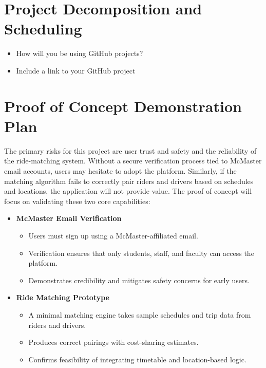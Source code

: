 \documentclass{article}
\begin{document}
\section{Project Decomposition and Scheduling}

\begin{itemize}
  \item How will you be using GitHub projects?
  \item Include a link to your GitHub project
\end{itemize}


\section{Proof of Concept Demonstration Plan}


The primary risks for this project are user trust and safety and the reliability of the ride-matching system.
Without a secure verification process tied to McMaster email accounts, users may hesitate to adopt the platform.
Similarly, if the matching algorithm fails to correctly pair riders and drivers based on schedules and locations, the application will not provide value.
The proof of concept will focus on validating these two core capabilities:

\begin{itemize}
  \item \textbf{McMaster Email Verification}
  \begin{itemize}
      \item Users must sign up using a McMaster-affiliated email.
      \item Verification ensures that only students, staff, and faculty can access the platform.
      \item Demonstrates credibility and mitigates safety concerns for early users.
  \end{itemize}

  \item \textbf{Ride Matching Prototype}
  \begin{itemize}
      \item A minimal matching engine takes sample schedules and trip data from riders and drivers.
      \item Produces correct pairings with cost-sharing estimates.
      \item Confirms feasibility of integrating timetable and location-based logic.
  \end{itemize}
\end{itemize}
\end{document}
